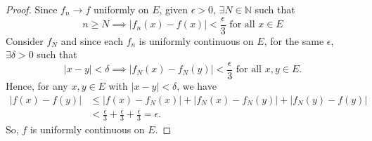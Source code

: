\begin{Exercise}
\begin{proof}
Since $f_n \to f$ uniformly on $E$, given $\epsilon > 0$, $\exists N\in\mathbb{N}$ such that $$n\geq N \implies \left| f_n(x)-f(x) \right| < \frac{\epsilon}{3}\mbox{ for all } x\in E$$
Consider $f_N$ and since each $f_n$ is uniformly continuous on $E$, for the same $\epsilon$, $\exists \delta>0$ such that $$\left| x-y \right| < \delta \implies \left| f_N(x)-f_N(y) \right| < \frac{\epsilon}{3}\mbox{ for all }x,y\in E.$$
Hence, for any $x, y\in E$ with $\left| x-y \right| < \delta$, we have
\begin{align*}
\left| f(x) - f(y) \right| 
&\leq \left| f(x) - f_N(x) \right| + \left| f_N(x) - f_N(y) \right| + \left| f_N(y) - f(y) \right| \\
&< \frac{\epsilon}{3} + \frac{\epsilon}{3} + \frac{\epsilon}{3} = \epsilon.
\end{align*}
So, $f$ is uniformly continuous on $E$.
\end{proof}
\end{Exercise}
